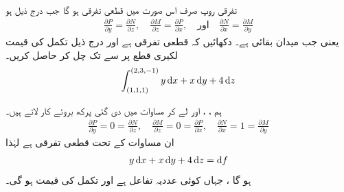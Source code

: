 \\
تفرقی روپ  صرف اس  صورت  میں قطعی تفرقی ہو گا جب درج ذیل ہو
\begin{align}\label{مساوات_سمتی_تکمل_پرکھ_قطعی_تفرقی}
\frac{\partial P}{\partial y}=\frac{\partial N}{\partial z},\quad \frac{\partial M}{\partial z}=\frac{\partial P}{\partial x}, \quad \text{اور}\quad \frac{\partial N}{\partial x}=\frac{\partial M}{\partial y}
\end{align}
یعنی   جب میدان  بقائی ہے۔
دکھائیں کہ  قطعی تفرقی ہے اور درج ذیل تکمل کی قیمت لکیری  قطع  پر  سے  تک چل کر حاصل کریں۔
\begin{align*}
\int_{(1,1,1)}^{(2,3,-1)} y\dif x+x\dif y+4\dif z
\end{align*}

ہم ، ،  اور  لے کر مساوات  میں دی گئی پرکھ بروئے کار لاتے ہیں۔
\begin{align*}
\frac{\partial P}{\partial y}=0=\frac{\partial N}{\partial z},\quad \frac{\partial M}{\partial z}=0=\frac{\partial P}{\partial x},\quad \frac{\partial N}{\partial x}=1=\frac{\partial M}{\partial y}
\end{align*}
ان مساوات کے تحت  قطعی تفرقی ہے لہٰذا 
\begin{align*}
 y\dif x+x\dif y+4\dif z=\dif f
\end{align*}
ہو گا ، جہاں  کوئی عددیہ تفاعل ہے اور تکمل کی  قیمت  ہو گی۔

